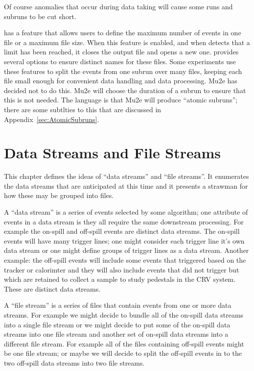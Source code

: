 Of course anomalies that occur during data taking will cause some runs
and subruns to be cut short.

\art has a feature that allows users to define the maximum
number of events in one file or a maximum file size.
When this feature is enabled,
and when \art detects that a limit has been reached,
it closes the output file and opens a new one.
\art provides several options to ensure distinct names for these files.
Some experiments use these features to split the events from one
subrun over many files,
keeping each file small enough for convenient data handling and data processing.
Mu2e has decided not to do this.
Mu2e will choose the duration of a subrun to ensure that this is not needed.
The language is that Mu2e will produce ``atomic subruns''; there are some
subtlties to this that are discussed in Appendix~\ref{sec:AtomicSubruns}.


\chapter{Data Streams and File Streams}
\label{ch:DataStreamsAndFileStreams}

This chapter defines the ideas of ``data streams'' and ``file streams''.
It enumerates the data streams that are anticipated at this time
and it presents a strawman for how these may be grouped into files.


A ``data stream'' is a series of events selected by some algorithm;
one attribute of events in a data stream is they all require the same downstream processing.
For example the on-spill and off-spill events are distinct data streams.
The on-spill events will have many trigger lines; one might consider each trigger
line it's own data stream or one might define groups of trigger lines as a data stream.
Another example: the off-spill events will include some events that triggered based on
the tracker or calorimter and they will also include events that did not trigger but
which are retained to collect a sample to study pedestals in the CRV system.
These are distinct data streams.

A ``file stream'' is a series of files that contain events from one or more data streams.
For example we might decide to bundle all of the on-spill data streams into a single
file stream or we might decide to put some of the on-spill data streams into one file
stream and another set of on-spill data streams into a different file stream.
For example all of the files containing off-spill events might be one file stream;
or maybe we will decide to split the off-spill events in to
the two off-spill data streams into two file streams.

